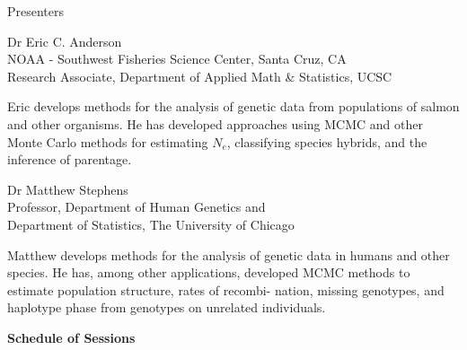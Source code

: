
\vspace*{1in}
\begin{center}\color{section0}\bf\Large
\coursetitlepage
\end{center}
\es\bs
\begin{center}\color{section0} Presenters\end{center}
\enlargethispage*{1000pt}

{\color{section0}Dr Eric C. Anderson\\
NOAA - Southwest Fisheries Science Center, Santa Cruz, CA\\
Research Associate, Department of Applied Math \& Statistics, UCSC}

Eric develops methods for the analysis of genetic data from populations of salmon and other organisms.  He has developed approaches using MCMC and other Monte Carlo methods for estimating $N_e$, classifying species hybrids, and the inference of parentage.

{\color{section0}Dr Matthew Stephens\\
Professor, Department of Human Genetics and\\
Department of Statistics, The University of Chicago}
  
Matthew develops methods for the analysis of genetic data in humans and other species. He has, among other applications, developed MCMC methods to estimate population structure, rates of recombi- nation, missing genotypes, and haplotype phase from genotypes on unrelated individuals.

\es\bs
\begin{center}
{\color{section0}\bf\Large Schedule of Sessions}
\vspace*{.25in}
\enlargethispage*{1000pt}

%

%

\end{center}


